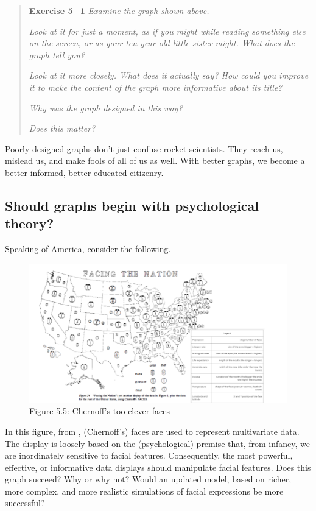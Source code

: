 \documentclass[
  openany]{book}
\begin{document}
\begin{quote}
\textbf{Exercise 5\_1}
\emph{Examine the graph shown above.}

\emph{Look at it for just a moment, as if you might while reading something else on the screen, or as your ten-year old little sister might. What does the graph tell you?}

\emph{Look at it more closely. What does it actually say? How could you improve it to make the content of the graph more informative about its title?}

\emph{Why was the graph designed in this way?}

\emph{Does this matter?}
\end{quote}

Poorly designed graphs don't just confuse rocket scientists. They reach us, mislead us, and make fools of all of us as well. With better graphs, we become a better informed, better educated citizenry.

\hypertarget{should-graphs-begin-with-psychological-theory}{%
\subsection{Should graphs begin with psychological theory?}\label{should-graphs-begin-with-psychological-theory}}

Speaking of America, consider the following.

\begin{figure}
\centering
\includegraphics{Chernoff.PNG}
\caption{Figure 5.5: Chernoff's too-clever faces}
\end{figure}

In this figure, from \citet{wainer1981graphical}, (Chernoff's) faces are used to represent multivariate data. The display is loosely based on the (psychological) premise that, from infancy, we are inordinately sensitive to facial features. Consequently, the most powerful, effective, or informative data displays should manipulate facial features. Does this graph succeed? Why or why not? Would an updated model, based on richer, more complex, and more realistic simulations of facial expressions \citep{thies2015real} be more successful?
\end{document}
